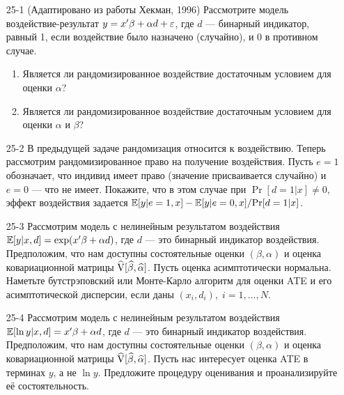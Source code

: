 \begin{enumerate}
\item[25-1] (Адаптировано из работы Хекман, 1996) Рассмотрите модель воздействие-результат $y = x' \beta +\alpha d + \varepsilon$, где $d$ --- бинарный индикатор, равный 1, если воздействие было назначено (случайно), и 0 в противном случае.
\begin{enumerate}
\item Является ли рандомизированное воздействие достаточным условием для оценки $\alpha$? 
\item Является ли рандомизированное воздействие достаточным условием для оценки $\alpha$ и $\beta$? 
\end{enumerate}

\item[25-2] В предыдущей задаче рандомизация относится к воздействию. Теперь рассмотрим рандомизированное право на получение воздействия. Пусть $e = 1$ обозначает, что индивид имеет право (значение присваивается случайно) и $e = 0$ --- что не имеет. Покажите, что в этом случае при $\Pr [d = 1 | x] \ne 0$, эффект воздействия задается $\mathbb{E} [y | e = 1, x] - \mathbb{E} [y | e = 0, x]/\mathrm{Pr}[d = 1|x]$.

\item[25-3] Рассмотрим модель с нелинейным результатом воздействия $\mathbb{E} [y|x,d] = \exp (x'\beta + \alpha d)$, где $d$ --- это бинарный индикатор воздействия. Предположим, что нам доступны состоятельные оценки $(\beta, \alpha)$ и оценка ковариационной матрицы $\widehat {\mathrm{V}} [\widehat{\beta}, \widehat{\alpha}]$. Пусть оценка асимптотически нормальна. Наметьте бутстрэповский или Монте-Карло алгоритм для оценки ATE и его асимптотической дисперсии, если даны $(x_i , d_i), \; i = 1, \dots, N$. 

\item[25-4] Рассмотрим модель с нелинейным результатом воздействия $\mathbb{E} [\ln y|x,d] = x'\beta + \alpha d$, где $d$ --- это бинарный индикатор воздействия. Предположим, что нам доступны состоятельные оценки $(\beta, \alpha)$ и оценка ковариационной матрицы $\widehat {\mathrm{V}} [\widehat{\beta}, \widehat{\alpha}]$. Пусть нас интересует оценка ATE в терминах $y$, а не $\ln y$. Предложите процедуру оценивания и проанализируйте её состоятельность. 


\end{enumerate}
